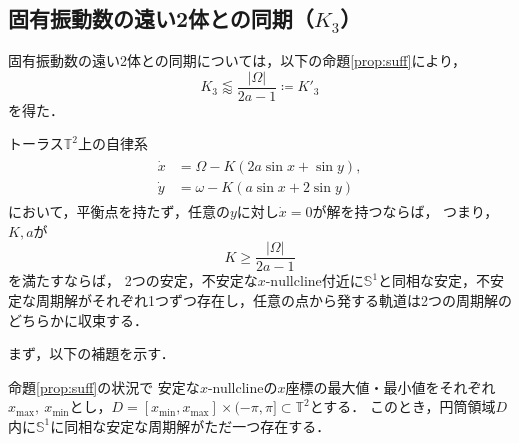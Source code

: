 \documentclass[../main]{subfiles}
\begin{document}
    \subsection{固有振動数の遠い2体との同期（$K_3$）}
    \label{sec:3body-k3}
    固有振動数の遠い2体との同期については，以下の命題\ref{prop:suff}により，
    \begin{equation}
        \label{eq;:K2-approx}
        K_3\lessapprox \frac{|\Omega|}{2a-1}\coloneqq K'_3
    \end{equation}
    を得た．
    \begin{screen}
        \begin{proposition}
            \label{prop:suff}
            トーラス$\mathbb{T}^2$上の自律系
            \begin{align}
                \label{eq:prop-2phase}
                \begin{split}
                    \dot{x}&=\Omega-K(2a\sin x+\sin y),\\
                    \dot{y}&=\omega-K(a\sin x+2\sin y)
                \end{split}
            \end{align}
            において，平衡点を持たず，任意の$y$に対し$\dot{x}=0$が解を持つならば，
            つまり，$K,a$が
            \begin{equation*}
                K\geq \frac{|\Omega|}{2a-1}
            \end{equation*}
            を満たすならば，
            2つの安定，不安定な$x$-$\mathrm{nullcline}$付近に$\mathbb{S}^1$と同相な安定，不安定な周期解がそれぞれ1つずつ存在し，任意の点から発する軌道は2つの周期解のどちらかに収束する．
        \end{proposition}
    \end{screen}
    まず，以下の補題を示す．
    \begin{screen}
        \begin{lemma}
            \label{lemma:annulus}
            命題\ref{prop:suff}の状況で
            安定な$x$-nullclineの$x$座標の最大値・最小値をそれぞれ$x_{\max},\ x_{\min}$とし，$D=[x_{\min},x_{\max}]\times (-\pi,\pi ]\subset\mathbb{T}^2$とする．
            このとき，円筒領域$D$内に$\mathbb{S}^1$に同相な安定な周期解がただ一つ存在する．        
        \end{lemma}
    \end{screen}
\end{document}
